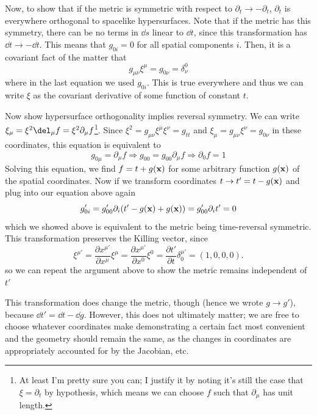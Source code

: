 \documentclass{report}
\begin{document}
Now, to show that if the metric is symmetric with respect to $ \partial_t
\rightarrow -\partial_t $, $ \partial_t $ is everywhere orthogonal to spacelike 
hypersurfaces. Note that if the metric has this symmetry, there can be no 
terms in $ \dd{s} $ linear to $ \dd{t} $, since this transformation has 
$ \dd{t} \rightarrow -\dd{t} $. This means that $ g_{0i} = 0 $ for all spatial 
components $ i $. Then, it is a covariant fact of the matter that
\begin{equation*}
	g_{\mu\nu}\xi^\mu = g_{0\nu} = \delta_\nu^0
\end{equation*}
where in the last equation we used $ g_{0i} $. This is true everywhere and 
thus we can write $ \xi $ as the covariant derivative of some function of constant 
$ t $. 

Now show hypersurface orthogonality implies reversal symmetry. We can write 
$ \xi_\mu = \xi^2 \del_\mu f = \xi^2 \partial_\mu f $\footnote{At least I'm
pretty sure you can; I justify it by noting it's still the case that $ \xi
=\partial_t $ by hypothesis, which means we can choose $ f $ such that $
\partial_\mu $ has unit length.}. Since $ \xi^2 = g_{\mu\nu}\xi^\mu \xi^\nu = g_{tt} $
and  $ \xi_\mu = g_{\mu\nu}\xi^\nu  = g_{0\nu}$ in these coordinates, this 
equation is equivalent to 
\begin{equation*}
	g_{0\mu} = \partial_\mu f \Longrightarrow g_{00} = g_{00} \partial_\mu f
	\Longrightarrow \partial_0 f = 1
\end{equation*}
Solving this equation, we find 
	$ f = t + g(\vb{x}) $
for some arbitrary function $ g(\vb{x}) $ of the spatial coordinates. Now if we 
transform coordinates $ t \rightarrow t' = t- g(\vb{x}) $ and plug into our equation 
above again 
\begin{equation*}
	g_{0i}' = g_{00}' \partial_i (t' - g(\vb{x}) + g(\vb{x}))
		= g_{00}'\partial_i t' = 0
\end{equation*}
which we showed above is equivalent to the metric being time-reversal symmetric. 
This transformation preserves the Killing vector, since 
\begin{equation*}
	\xi^{\mu'} = \frac{\partial x^{\mu'}}{\partial x^\mu} \xi^\mu
		= \frac{\partial x^{\mu'}}{\partial x^0} \xi^0 
		= \frac{\partial t'}{\partial t} \delta_{0}^{\mu'}
		= (1, 0, 0 ,0).
\end{equation*}
so we can repeat the argument above to show the metric remains independent of $ t' $

This transformation does change the metric, though (hence we wrote $ g
\rightarrow g' $), because $ \dd{t'} = \dd{t} - \dd{g} $. However, this does not
ultimately matter; we are free to choose whatever coordinates make demonstrating
a certain fact most convenient and the geometry should remain the same, as the
changes in coordinates are appropriately accounted for by the Jacobian, etc.
\end{document}
